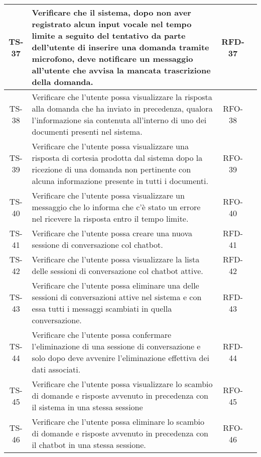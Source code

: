 \begin{xltabular}{\textwidth}{| c | X | c | c |}
    TS-37 & Verificare che il sistema, dopo non aver registrato alcun input vocale nel tempo limite a seguito del tentativo da parte dell'utente di inserire una domanda tramite microfono, deve notificare un messaggio all'utente che avvisa la mancata trascrizione della domanda. & RFD-37 & \textcolor{xmarkcolor}{} \\
    \hline
    TS-38 & Verificare che l’utente possa visualizzare la risposta alla domanda che ha inviato in precedenza, qualora l'informazione sia contenuta all'interno di uno dei documenti presenti nel sistema. &  RFO-38 & \textcolor{xmarkcolor}{} \\
    \hline
    TS-39 & Verificare che l’utente possa visualizzare una risposta di cortesia prodotta dal sistema dopo la ricezione di una domanda non pertinente con alcuna informazione presente in tutti i documenti. & RFO-39 & \textcolor{xmarkcolor}{} \\
    \hline
    TS-40 & Verificare che l'utente possa visualizzare un messaggio che lo informa che c'è stato un errore nel ricevere la risposta entro il tempo limite. & RFO-40 & \textcolor{xmarkcolor}{} \\
    \hline
    TS-41 & Verificare che l'utente possa creare una nuova sessione di conversazione col chatbot. & RFD-41 & \textcolor{xmarkcolor}{} \\
    \hline
    TS-42 & Verificare che l'utente possa visualizzare la lista delle sessioni di conversazione col chatbot attive. & RFD-42 & \textcolor{xmarkcolor}{} \\
    \hline
    TS-43 & Verificare che l'utente possa eliminare una delle sessioni di conversazioni attive nel sistema e con essa tutti i messaggi scambiati in quella conversazione. & RFD-43 & \textcolor{xmarkcolor}{} \\
    \hline
    TS-44 & Verificare che l'utente possa confermare l’eliminazione di una sessione di conversazione e solo dopo deve avvenire l'eliminazione effettiva dei dati associati. & RFD-44 & \textcolor{xmarkcolor}{} \\
    \hline
    TS-45 & Verificare che l'utente possa visualizzare lo scambio di domande e risposte avvenuto in precedenza con il sistema in una stessa sessione & RFO-45 & \textcolor{xmarkcolor}{} \\
    \hline
    TS-46 & Verificare che l'utente possa eliminare lo scambio di domande e risposte avvenuto in precedenza con il chatbot in una stessa sessione. & RFO-46 & \textcolor{xmarkcolor}{} \\

\end{xltabular}
